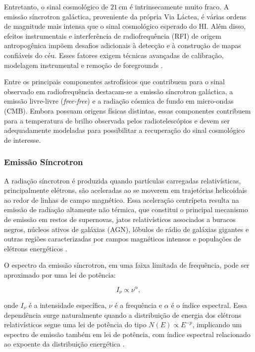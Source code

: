 Entretanto, o sinal cosmológico de \(21\,\mathrm{cm}\) é intrinsecamente muito fraco. A emissão síncrotron galáctica, proveniente da própria Via Láctea, é várias ordens de magnitude mais intensa que o sinal cosmológico esperado do HI. Além disso, efeitos instrumentais e interferência de radiofrequência (RFI) de origem antropogênica impõem desafios adicionais à detecção e à construção de mapas confiáveis do céu. Esses fatores exigem técnicas avançadas de calibração, modelagem instrumental e remoção de foregrounds \cite{harper2018potential}.

Entre os principais componentes astrofísicos que contribuem para o sinal observado em radiofrequência destacam-se a emissão síncrotron galáctica, a emissão livre-livre (\textit{free-free}) e a radiação cósmica de fundo em micro-ondas (CMB). Embora possuam origens físicas distintas, essas componentes contribuem para a temperatura de brilho observada pelos radiotelescópios e devem ser adequadamente modeladas para possibilitar a recuperação do sinal cosmológico de interesse.

\subsubsection{Emissão Síncrotron}

A radiação síncrotron é produzida quando partículas carregadas relativísticas, principalmente elétrons, são aceleradas ao se moverem em trajetórias helicoidais ao redor de linhas de campo magnético. Essa aceleração centrípeta resulta na emissão de radiação altamente não térmica, que constitui o principal mecanismo de emissão em restos de supernovas, jatos relativísticos associados a buracos negros, núcleos ativos de galáxias (AGN), lóbulos de rádio de galáxias gigantes e outras regiões caracterizadas por campos magnéticos intensos e populações de elétrons energéticos \cite{slac_synchrotrons_explained, burke2019introduction}.

O espectro da emissão síncrotron, em uma faixa limitada de frequência, pode ser aproximado por uma lei de potência:

\begin{equation}
    I_\nu \propto \nu^{\alpha},
\end{equation}

onde \(I_\nu\) é a intensidade específica, \(\nu\) é a frequência e \(\alpha\) é o índice espectral. Essa dependência surge naturalmente quando a distribuição de energia dos elétrons relativísticos segue uma lei de potência do tipo \(N(E) \propto E^{-p}\), implicando um espectro de emissão também em lei de potência, com índice espectral relacionado ao expoente da distribuição energética \cite{EEL2018}.

